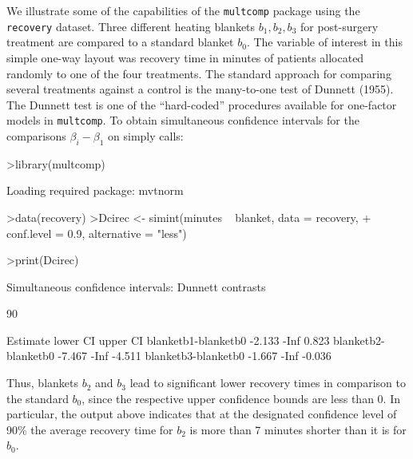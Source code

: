 \documentclass{article}
\begin{document}
We illustrate some of the capabilities of the \texttt{multcomp}
package using the \texttt{recovery} dataset. Three
different heating blankets $b_1, b_2, b_3$ for post-surgery
treatment are compared to a standard blanket $b_0$. The variable
of interest in this simple one-way layout was recovery time in
minutes of patients allocated randomly to one of the four
treatments. The standard approach for comparing several treatments
against a control is the many-to-one test of Dunnett (1955). The
Dunnett test is one of the ``hard-coded'' procedures available for
one-factor models in \texttt{multcomp}. To obtain simultaneous
confidence intervals for the comparisons $\beta_i - \beta_1$ on
simply calls:
\small
\begin{Schunk}
\begin{Sinput}
>library(multcomp)
\end{Sinput}
\begin{Soutput}
Loading required package: mvtnorm 
\end{Soutput}
\begin{Sinput}
>data(recovery)
>Dcirec <- simint(minutes ~ blanket, data = recovery, 
+     conf.level = 0.9, alternative = "less")
\end{Sinput}
\end{Schunk}
\begin{Schunk}
\begin{Sinput}
>print(Dcirec)
\end{Sinput}
\begin{Soutput}
	Simultaneous confidence intervals: Dunnett
	contrasts

	90 % confidence intervals

                    Estimate lower CI upper CI
blanketb1-blanketb0   -2.133     -Inf    0.823
blanketb2-blanketb0   -7.467     -Inf   -4.511
blanketb3-blanketb0   -1.667     -Inf   -0.036
\end{Soutput}
\end{Schunk}
\normalsize
Thus, blankets $b_2$ and $b_3$ lead to significant lower recovery
times in comparison to the standard $b_0$, since the respective
upper confidence bounds are less than 0. In particular, the output
above indicates that at the designated confidence level of 90\%
the average recovery time for $b_2$ is more than 7 minutes shorter
than it is for $b_0$.
\end{document}
